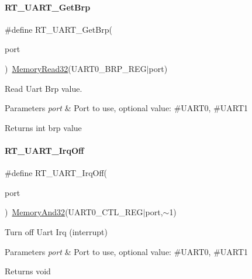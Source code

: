 \paragraph{\texorpdfstring{R\+T\+\_\+\+U\+A\+R\+T\+\_\+\+Get\+Brp}{RT\_UART\_GetBrp}}
{\footnotesize\ttfamily \#define R\+T\+\_\+\+U\+A\+R\+T\+\_\+\+Get\+Brp(\begin{DoxyParamCaption}\item[{}]{port }\end{DoxyParamCaption})~\mbox{\hyperlink{a00020_a706b02571285f92589fbb0b964d7d0bb}{Memory\+Read32}}(U\+A\+R\+T0\+\_\+\+B\+R\+P\+\_\+\+R\+EG$\vert$port)}



Read Uart Brp value. 


\begin{DoxyParams}{Parameters}
{\em port} & Port to use, optional value\+: \#\+U\+A\+R\+T0, \#\+U\+A\+R\+T1 \\
\hline
\end{DoxyParams}
\begin{DoxyReturn}{Returns}
int brp value 
\end{DoxyReturn}
\mbox{\label{a00056_acf04f21e0b0f598ac00a1a08eb4e5f2e}} 
\paragraph{\texorpdfstring{R\+T\+\_\+\+U\+A\+R\+T\+\_\+\+Irq\+Off}{RT\_UART\_IrqOff}}
{\footnotesize\ttfamily \#define R\+T\+\_\+\+U\+A\+R\+T\+\_\+\+Irq\+Off(\begin{DoxyParamCaption}\item[{}]{port }\end{DoxyParamCaption})~\mbox{\hyperlink{a00020_a5c1a2bd4c1bd4c2f429d8042a45327ff}{Memory\+And32}}(U\+A\+R\+T0\+\_\+\+C\+T\+L\+\_\+\+R\+EG$\vert$port,$\sim$1)}



Turn off Uart Irq (interrupt) 


\begin{DoxyParams}{Parameters}
{\em port} & Port to use, optional value\+: \#\+U\+A\+R\+T0, \#\+U\+A\+R\+T1 \\
\hline
\end{DoxyParams}
\begin{DoxyReturn}{Returns}
void 
\end{DoxyReturn}
\mbox{\label{a00056_a5ed058b5d506df45c51358b8451550ad}} 
